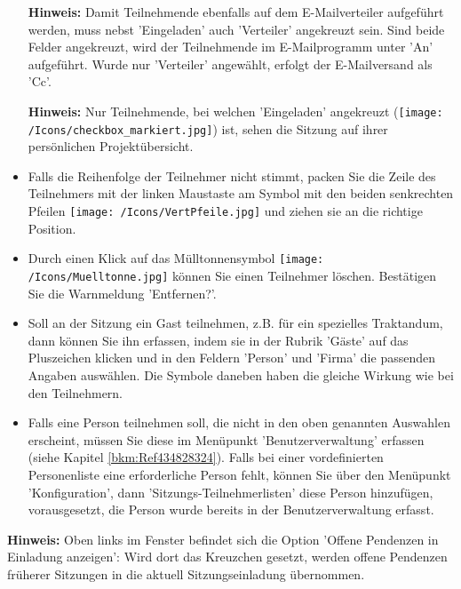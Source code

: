 \begin{itemize}
\vspace{\baselineskip}

\textbf{Hinweis:} Damit Teilnehmende ebenfalls auf dem E-Mailverteiler aufgeführt werden, muss nebst 'Eingeladen' auch 'Verteiler' angekreuzt sein. Sind beide Felder angekreuzt, wird der Teilnehmende im E-Mailprogramm unter 'An' aufgeführt. Wurde nur 'Verteiler' angewählt, erfolgt der E-Mailversand als 'Cc'.

\vspace{\baselineskip}

\textbf{Hinweis:} Nur Teilnehmende, bei welchen 'Eingeladen' angekreuzt (\texttt{[image: /Icons/checkbox\_markiert.jpg]}) ist, sehen die Sitzung auf ihrer persönlichen Projektübersicht.
\item 
Falls die Reihenfolge der Teilnehmer nicht stimmt, packen Sie die Zeile des Teilnehmers mit der linken Maustaste am Symbol mit den beiden senkrechten Pfeilen \texttt{[image: /Icons/VertPfeile.jpg]}  und ziehen sie an die richtige Position.
\item 
Durch einen Klick auf das Mülltonnensymbol \texttt{[image: /Icons/Muelltonne.jpg]}  können Sie einen Teilnehmer löschen. Bestätigen Sie die Warnmeldung 'Entfernen?'.
\item 
Soll an der Sitzung ein Gast teilnehmen, z.B. für ein spezielles Traktandum, dann können Sie ihn erfassen, indem sie in der Rubrik 'Gäste' auf das Pluszeichen klicken und in den Feldern 'Person' und 'Firma' die passenden Angaben auswählen. Die Symbole daneben haben die gleiche Wirkung wie bei den Teilnehmern.
\item 
Falls eine Person teilnehmen soll, die nicht in den oben genannten Auswahlen erscheint, müssen Sie diese im Menüpunkt 'Benutzerverwaltung' erfassen (siehe Kapitel \ref{bkm:Ref434828324}). Falls bei einer vordefinierten Personenliste eine erforderliche Person fehlt, können Sie über den Menüpunkt 'Konfiguration', dann 'Sitzungs-Teilnehmerlisten' diese Person hinzufügen, vorausgesetzt, die Person wurde bereits in der Benutzerverwaltung erfasst.
\end{itemize}

\vspace{\baselineskip}

\textbf{Hinweis:} Oben links im Fenster befindet sich die Option 'Offene Pendenzen in Einladung anzeigen': Wird dort das Kreuzchen gesetzt, werden offene Pendenzen früherer Sitzungen in die aktuell Sitzungseinladung übernommen.

\vspace{\baselineskip}

